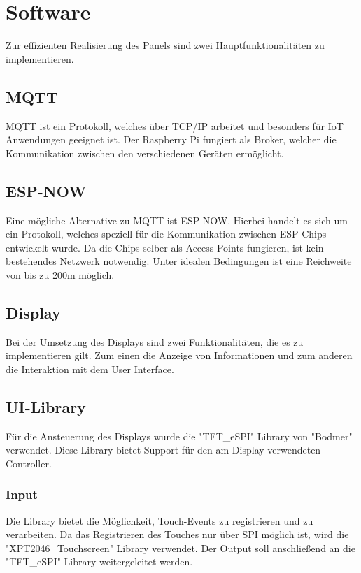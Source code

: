         \section{Software}
        Zur effizienten Realisierung des Panels sind zwei 
        Hauptfunktionalitäten zu implementieren.

            \subsection{MQTT}
            MQTT ist ein Protokoll, welches über TCP/IP arbeitet
            und besonders für IoT Anwendungen geeignet ist. Der 
            Raspberry Pi fungiert als Broker, welcher die
            Kommunikation zwischen den verschiedenen Geräten
            ermöglicht.

            

            \subsection{ESP-NOW}
            Eine mögliche Alternative zu MQTT ist ESP-NOW.
            Hierbei handelt es sich um ein Protokoll, welches
            speziell für die Kommunikation zwischen ESP-Chips
            entwickelt wurde. Da die Chips selber als Access-Points
            fungieren, ist kein bestehendes Netzwerk notwendig. Unter 
            idealen Bedingungen ist eine Reichweite von bis zu 200m 
            möglich.
            
            \subsection{Display}
            Bei der Umsetzung des Displays sind zwei Funktionalitäten,
            die es zu implementieren gilt. Zum einen die Anzeige von
            Informationen und zum anderen die Interaktion mit dem
            User Interface. 
            \subsection{UI-Library}
            Für die Ansteuerung des Displays wurde die "TFT\_eSPI"
            \space Library von "Bodmer" verwendet. Diese Library bietet
            Support für den am Display verwendeten Controller.
            
                \subsubsection{Input}
                Die Library bietet die Möglichkeit, Touch-Events zu
                registrieren und zu verarbeiten. Da das Registrieren
                des Touches nur über SPI möglich ist, wird die
                "XPT2046\_Touchscreen" Library verwendet. Der Output
                soll anschließend an die "TFT\_eSPI" Library weitergeleitet
                werden.

            
        